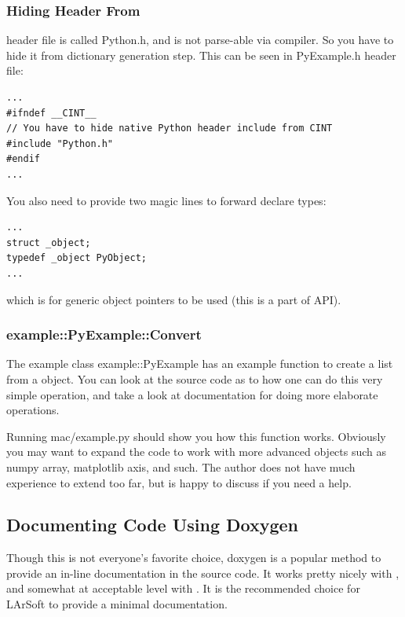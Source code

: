 \subsubsection{Hiding \python Header From \CINT}
\python header file is called {\ttfamily Python.h}, and is not parse-able via \ROOT \CINT
compiler. So you have to hide it from \CINT dictionary generation step. This can be seen
in {\ttfamily PyExample.h} header file:
\begin{lstlisting}
...
#ifndef __CINT__
// You have to hide native Python header include from CINT                                                                                                                                                  
#include "Python.h"
#endif
...
\end{lstlisting}

You also need to provide two magic lines to forward declare types:
\begin{lstlisting}
...
struct _object;
typedef _object PyObject;
...
\end{lstlisting}
which is for \python generic object pointers to be used (this is a part of \python \CPP API).

\subsubsection{{\ttfamily example::PyExample::Convert}}
The example class {\ttfamily example::PyExample} has an example function to create a
\python list from a  object. You can look at the
source code as to how one can do this very simple operation, and take a look at \python
documentation for doing more elaborate operations.

Running {\ttfamily mac/example.py} should show you how this function works.
Obviously you may want to expand the code to work with more advanced \python objects
such as {\ttfamily numpy} array, {\ttfamily matplotlib} axis, and such. The author
does not have much experience to extend too far, but is happy to discuss if you need a help.

\subsection{Documenting Code Using {\ttfamily Doxygen}}
Though this is not everyone's favorite choice, {\ttfamily doxygen} is a popular method to
provide an in-line documentation in the source code. It works pretty nicely with \CPP, and
somewhat at acceptable level with \python. It is the recommended choice for LArSoft to provide
a minimal documentation.

